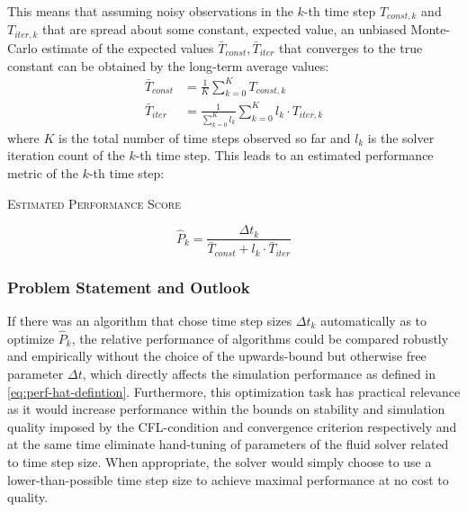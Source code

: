 \documentclass[oneside, a4paper]{book}
\newcommand{\equationnamed}[2]{%
  \setlength{\fboxsep}{2pt} %
  \setlength{\fboxrule}{0.01pt}
  \begin{center}
    \begin{minipage}{\textwidth}
      \begin{center}\textsc{#1}\end{center}
      #2
    \end{minipage}
  \end{center}
}
\begin{document}
    This means that assuming noisy observations in the $k$-th time step $T_{const,k}$ and $T_{iter,k}$ that are spread about some constant, expected value, an unbiased Monte-Carlo estimate of the expected values $\bar{T}_{const}, \bar{T}_{iter}$ that converges to the true constant can be obtained by the long-term average values:
    \begin{align}
      \bar{T}_{const} &= \frac{1}{K}\sum_{k=0}^K T_{const,k}\\
      \bar{T}_{iter} &= \frac{1}{\sum_{k=0}^K l_k}\sum_{k=0}^K  l_k \cdot T_{iter,k}
    \end{align}
    where $K$ is the total number of time steps observed so far and $l_k$ is the solver iteration count of the $k$-th time step. This leads to an estimated performance metric of the $k$-th time step:
    \equationnamed{Estimated Performance Score}{
      \begin{equation}\label{eq:perf-hat-defintion}
        \hat{P}_k = \frac{\Delta t_k}{\bar{T}_{const} + l_k \cdot \bar{T}_{iter}}
      \end{equation}
    }
    
    \subsubsection{Problem Statement and Outlook}

    If there was an algorithm that chose time step sizes $\Delta t_k$ automatically as to optimize $\hat{P}_k$, the relative performance of algorithms could be compared robustly and empirically without the choice of the upwards-bound but otherwise free parameter $\Delta t$, which directly affects the simulation performance as defined in \autoref{eq:perf-hat-defintion}. Furthermore, this optimization task has practical relevance as it would increase performance within the bounds on stability and simulation quality imposed by the CFL-condition and convergence criterion respectively and at the same time eliminate hand-tuning of parameters of the fluid solver related to time step size. When appropriate, the solver would simply choose to use a lower-than-possible time step size to achieve maximal performance at no cost to quality. 
\end{document}
